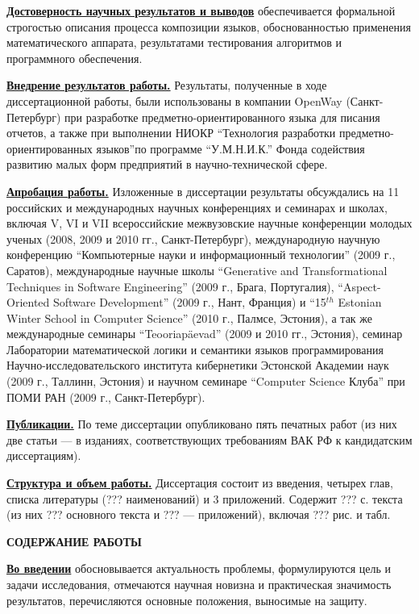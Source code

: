 \documentclass[12pt,a4paper]{article}
\theoremstyle{definition}
\theoremstyle{plain}
\newcommand{\afsection}[1]{\par \begin{center}\textbf{\MakeUppercase{#1}}\end{center}}
\newcommand{\afsubsection}[1]{\par \textbf{\underline{#1}}}
\begin{document}
\afsubsection{Достоверность научных результатов и выводов} обеспечивается формальной строгостью описания процесса композиции языков, обоснованностью применения математического аппарата, результатами тестирования алгоритмов и программного обеспечения.

\afsubsection{Внедрение результатов работы.} Результаты, полученные в ходе диссертационной работы, были использованы в компании OpenWay (Санкт-Петербург) при разработке предметно-ориентированного языка для писания отчетов, а также при выполнении НИОКР ``Технология разработки предметно-ориентированных языков''по программе ``У.М.Н.И.К.'' Фонда содействия развитию малых форм предприятий в научно-технической сфере.

\afsubsection{Апробация работы.} Изложенные в диссертации результаты обсуждались на 11 российских и международных научных конференциях и семинарах и школах, включая V, VI и VII всероссийские межвузовские научные конференции молодых ученых (2008, 2009 и 2010 гг., Санкт-Петербург), международную научную конференцию ``Компьютерные науки и информационный технологии'' (2009 г., Саратов), международные научные школы ``Generative and Transformational Techniques in Software Engineering'' (2009 г., Брага, Португалия), ``Aspect-Oriented Software Development'' (2009 г., Нант, Франция) и ``15$^{th}$ Estonian Winter School in Computer Science'' (2010 г., Палмсе, Эстония), а так же международные семинары ``Teooriapäevad'' (2009 и 2010 гг., Эстония), семинар Лаборатории математической логики и семантики языков программирования Научно-исследовательского института кибернетики Эстонской Академии наук (2009 г., Таллинн, Эстония) и научном семинаре ``Computer Science Клуба'' при ПОМИ РАН (2009 г., Санкт-Петербург).

\afsubsection{Публикации.} По теме диссертации опубликовано пять печатных работ (из них две статьи --- в изданиях, соответствующих требованиям ВАК РФ к кандидатским диссертациям).

\afsubsection{Структура и объем работы.} Диссертация состоит из введения, четырех глав, списка литературы (??? наименований) и 3 приложений. Содержит ??? с. текста (из них ??? основного текста и ??? --- приложений), включая ??? рис. и табл.

\newpage
\afsection{Содержание работы}

\afsubsection{Во введении} обосновывается актуальность проблемы, формулируются цель и задачи исследования, отмечаются научная новизна и практическая значимость результатов, перечисляются основные положения, выносимые на защиту.
\end{document}
